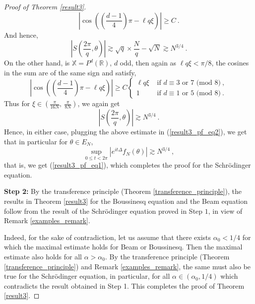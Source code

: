 \documentclass[12pt]{amsart}
\theoremstyle{definition}
\newcommand{\R}{\mathbb R}%
\newcommand{\X}{\mathbb X}%
\numberwithin{equation}{section}
\begin{document}
\begin{proof}[Proof of Theorem \ref{result3}]
\begin{equation*}
\left|\cos\left(\left(\frac{d-1}{4}\right)\pi - \ell q \xi\right)\right| \ge C\:.
\end{equation*}
And hence,
\begin{equation*}
\left|S\left(\frac{2\pi}{q},\theta \right)\right| \gtrsim \sqrt{q} \times \frac{N}{q} -\sqrt{N} \gtrsim N^{3/4}\:.
\end{equation*}
On the other hand, is $\X=P^d(\R)$, $d$ odd, then again as $\ell q \xi < \pi/8$, the cosines in the sum are of the same sign and satisfy,
\begin{equation*}
\left|\cos\left(\left(\frac{d-1}{4}\right)\pi - \ell q \xi\right)\right| \ge C \begin{cases}
	 \ell q \xi  &\text{ if }  d \equiv 3 \text{ or } 7 \text{ (mod }8)\:, \\
	1\: &\text{ if }  d \equiv 1 \text{ or } 5 \text{ (mod }8)\:.
	\end{cases}
\end{equation*}
Thus for $\xi \in \left(\frac{\pi}{16N},\:\frac{\pi}{8N}\right)$, we again get
\begin{equation*}
\left|S\left(\frac{2\pi}{q},\theta \right)\right| \gtrsim  N^{3/4}\:.
\end{equation*}
Hence, in either case, plugging the above estimate in (\ref{result3_pf_eq2}), we get that in particular for $\theta \in E_N$,
\begin{equation*} 
\sup_{0\le t <2\pi}\left| e^{it\Delta} f_N(\theta)\right| \gtrsim N^{3/4}\:,
\end{equation*}
that is, we get (\ref{result3_pf_eq1}), which completes the proof for the Schr\"odinger equation.

\medskip

{\bf Step 2:} By the transference principle (Theorem \ref{transference_principle}), the results in Theorem \ref{result3} for the Boussinesq equation and the Beam equation follow from the result of the Schr\"odinger equation proved in Step $1$, in view of Remark \ref{examples_remark}. 

Indeed, for the sake of contradiction, let us assume that there exists $\alpha_0<1/4$ for which the maximal estimate holds for Beam or Boussinesq. Then the maximal estimate also holds for all $\alpha > \alpha_0$. By the transference principle (Theorem \ref{transference_principle}) and Remark \ref{examples_remark}, the same must also be true for the Schr\"odinger equation, in particular, for all $\alpha \in (\alpha_0,1/4)$ which contradicts the result obtained in Step 1. This completes the proof of Theorem \ref{result3}.
\end{proof}
\end{document}
